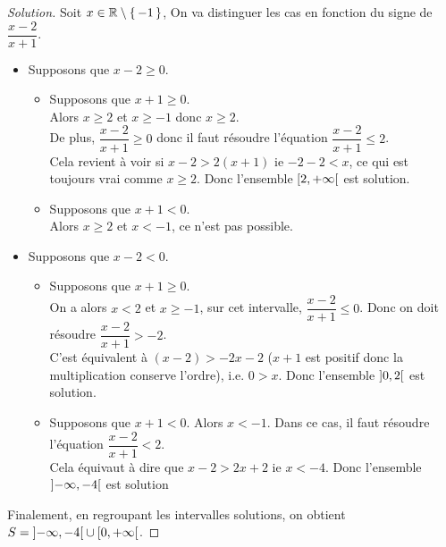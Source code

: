 \documentclass{classe}
\newenvironment{solution}
  {\renewcommand\qedsymbol{$\blacksquare$}\begin{proof}[Solution]}
  {\end{proof}}
\begin{document}
\begin{solution}
Soit $x \in \setRealNumbers \setminus \set{-1}$,
On va distinguer les cas en fonction du signe de $\dfrac{x-2}{x+1}$.
\begin{itemize}
\item Supposons que $x-2 \ge 0$.
\begin{itemize}
\item Supposons que $x+1 \ge 0$.\\
Alors $x \ge 2$ et $x \ge -1$ donc $x \ge 2$.\\
De plus, $\dfrac{x-2}{x+1} \ge 0$ donc il faut résoudre l'équation $\dfrac{x-2}{x+1} \le 2$.\\
Cela revient à voir si $x-2 > 2(x+1)$ ie $-2-2 < x$, ce qui est toujours vrai comme $x \ge 2$. Donc l'ensemble $\left[ 2 , +\infty \right[$ est solution.
\item Supposons que $x+1 < 0$.\\
Alors $x \ge 2$ et $x < -1$, ce n'est pas possible.
\end{itemize}
\item Supposons que $x-2 < 0$.
\begin{itemize}
\item Supposons que $x+1 \ge 0$.\\
On a alors $x < 2$ et $x \ge -1$, sur cet intervalle, $\dfrac{x-2}{x+1} \le 0$.
Donc on doit résoudre $\dfrac{x-2}{x+1} > -2$. \\
C'est équivalent à $(x-2) > -2x - 2$ ($x+1$ est positif donc la multiplication conserve l'ordre), i.e. $0 >x$. Donc l'ensemble $\left] 0 , 2 \right[$  est solution.
\item Supposons que $x+1 < 0$.
Alors $x < -1$. Dans ce cas, il faut résoudre l'équation $\dfrac{x-2}{x+1} < 2$.\\
Cela équivaut à dire que $x - 2 > 2x + 2$ ie $x < -4$. Donc l'ensemble $\left] -\infty , -4 \right[$ est solution
\end{itemize}
\end{itemize}
 
Finalement, en regroupant les intervalles solutions, on obtient $S = \left] -\infty , -4 \right[ \cup \left[ 0 , +\infty \right[$.
\end{solution}
\end{document}
